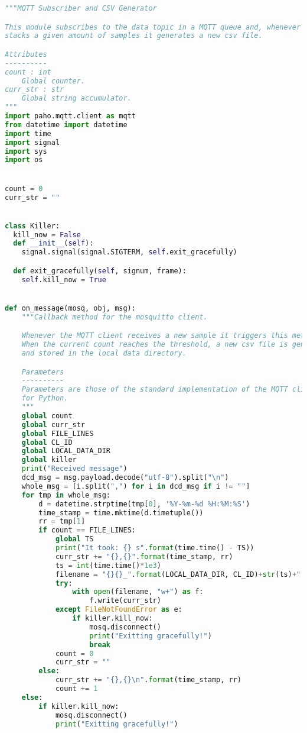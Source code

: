 \begin{lstlisting}[language=Python,caption={Implementation of the \texttt{mqtt-subscriber} service.},label=code:mqtt-sub]
"""MQTT Subscriber and CSV Generator

This module subscribes to the data topic in a MQTT queue and, whenever it
stacks a given amount of samples it generates a new csv file.

Attributes
----------
count : int
    Global counter.
curr_str : str
    Global string accumulator.
"""
import paho.mqtt.client as mqtt
from datetime import datetime
import time
import signal
import sys
import os


count = 0
curr_str = ""


class Killer:
  kill_now = False
  def __init__(self):
    signal.signal(signal.SIGTERM, self.exit_gracefully)

  def exit_gracefully(self, signum, frame):
    self.kill_now = True


def on_message(mosq, obj, msg):
    """Callback method for the mosquitto client.

    Whenever the MQTT client receives a new sample it triggers this method.
    When the current count reaches the threshold, a new csv file is generated
    and stored in the local data directory.

    Parameters
    ----------
    Parameters are those of the standard implementation of the MQTT client
    for Python.
    """
    global count
    global curr_str
    global FILE_LINES
    global CL_ID
    global LOCAL_DATA_DIR
    global killer
    print("Received message")
    dcd_msg = msg.payload.decode("utf-8").split("\n")
    whole_msg = [i.split(",") for i in dcd_msg if i != ""] 
    for tmp in whole_msg:
        d = datetime.strptime(tmp[0], '%Y-%m-%d %H:%M:%S')
        time_stamp = time.mktime(d.timetuple())
        rr = tmp[1]
        if count == FILE_LINES:
            global TS
            print("It took: {} s".format(time.time() - TS))
            curr_str += "{},{}".format(time_stamp, rr)
            ts = int(time.time()*1e3)
            filename = "{}{}_".format(LOCAL_DATA_DIR, CL_ID)+str(ts)+".csv"
            try:
                with open(filename, "w+") as f:
                    f.write(curr_str)
            except FileNotFoundError as e:
                if killer.kill_now:
                    mosq.disconnect()
                    print("Exitting gracefully!")
                    break
            count = 0
            curr_str = ""
        else:
            curr_str += "{},{}\n".format(time_stamp, rr)
            count += 1
    else:
        if killer.kill_now:
            mosq.disconnect()
            print("Exitting gracefully!")



\end{lstlisting}
